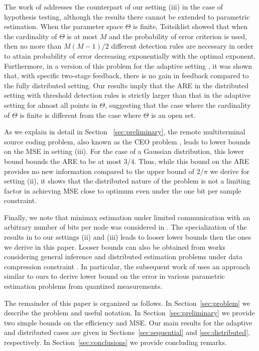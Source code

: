 The work of \cite{52470} addresses the counterpart of our setting (iii) in the case of hypothesis testing, although the results there cannot be extended to parametric estimation. When the parameter space $\Theta$ is finite, Tsitsiklist \cite{tsitsiklis1988decentralized} showed that when the cardinality of $\Theta$ is at most $M$ and the probability of error criterion is used, then no more than $M(M-1)/2$ different detection rules are necessary in order to attain probability of error decreasing exponentially with the optimal exponent. %
Furthermore, in a version of this problem for the adaptive setting \cite{5751320}, it was shown that, with specific two-stage feedback, there is no gain in feedback compared to the fully distributed setting. Our results imply that the ARE in the distributed setting with threshold detection rules is strictly larger than that in the adaptive setting for almost all points in $\Theta$, suggesting that the case where the cardinality of $\Theta$ is finite is different from the case where $\Theta$ is an open set.\par
%
As we explain in detail in Section~ \ref{sec:preliminary}, the remote multiterminal source coding problem, also known as the CEO problem \cite{berger1996ceo, viswanathan1997quadratic, oohama1998rate, prabhakaran2004rate}, leads to lower bounds on the MSE in setting (iii). For the case of a Gaussian distribution, this lower bound bounds the ARE to be at most $3/4$. Thus, while this bound on the ARE provides no new information compared to the upper bound of $2/\pi$ we derive for setting (ii), it shows that the distributed nature of the problem is not a limiting factor in achieving MSE close to optimum even under the one bit per sample constraint. 
 \par
% 
Finally, we note that minimax estimation under limited communication with an arbitrary number of bits per node was considered in 
\cite{zhang2013information, duchi2014optimality}. The specialization of the results in \cite{zhang2013information, duchi2014optimality} to our settings (ii) and (iii) leads to looser lower bounds then the ones we derive in this paper. Looser bounds can also be obtained from works considering general inference and distributed estimation problems under data compression constraint \cite{DBLP:journals/corr/abs-1802-08417, zhang1988estimation, han2018distributed, xu2017information, Barnes2018}. In particular, the subsequent work of \cite{Barnes2018} uses an approach similar to ours to derive lower bound on the error in various parametric estimation problems from quantized measurements. \par


The remainder of this paper is organized as follows. In Section~\ref{sec:problem} we describe the problem and useful notation. In Section~\ref{sec:preliminary} we provide two simple bounds on the efficiency and MSE. Our main results for the adaptive and distributed cases are given in Sections~\ref{sec:sequential} and \ref{sec:distributed}, respectively. In Section~\ref{sec:conclusions} we provide concluding remarks. 
